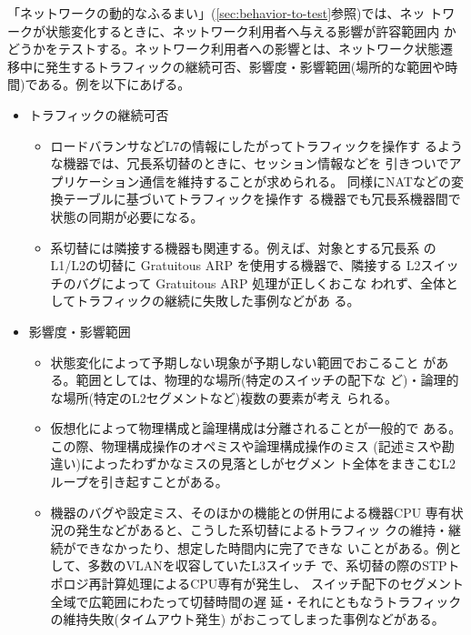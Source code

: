 「ネットワークの動的なふるまい」(\ref{sec:behavior-to-test}参照)では、ネッ
トワークが状態変化するときに、ネットワーク利用者へ与える影響が許容範囲内
かどうかをテストする。ネットワーク利用者への影響とは、ネットワーク状態遷
移中に発生するトラフィックの継続可否、影響度・影響範囲(場所的な範囲や時
間)である。例を以下にあげる。
\begin{itemize}
 \item トラフィックの継続可否
       \begin{itemize}
        \item ロードバランサなどL7の情報にしたがってトラフィックを操作す
              るような機器では、冗長系切替のときに、セッション情報などを
              引きついでアプリケーション通信を維持することが求められる。
              同様にNATなどの変換テーブルに基づいてトラフィックを操作す
              る機器でも冗長系機器間で状態の同期が必要になる。
        \item 系切替には隣接する機器も関連する。例えば、対象とする冗長系
              のL1/L2の切替に Gratuitous ARP を使用する機器で、隣接する
              L2スイッチのバグによって Gratuitous ARP 処理が正しくおこな
              われず、全体としてトラフィックの継続に失敗した事例などがあ
              る。
       \end{itemize}
 \item 影響度・影響範囲
       \begin{itemize}
        \item 状態変化によって予期しない現象が予期しない範囲でおこること
              がある。範囲としては、物理的な場所(特定のスイッチの配下な
              ど)・論理的な場所(特定のL2セグメントなど)複数の要素が考え
              られる。
        \item 仮想化によって物理構成と論理構成は分離されることが一般的で
              ある。この際、物理構成操作のオペミスや論理構成操作のミス
              (記述ミスや勘違い)によったわずかなミスの見落としがセグメン
              ト全体をまきこむL2ループを引き起すことがある。
        \item 機器のバグや設定ミス、そのほかの機能との併用による機器CPU
              専有状況の発生などがあると、こうした系切替によるトラフィッ
              クの維持・継続ができなかったり、想定した時間内に完了できな
              いことがある。例として、多数のVLANを収容していたL3スイッチ
              で、系切替の際のSTPトポロジ再計算処理によるCPU専有が発生し、
              スイッチ配下のセグメント全域で広範囲にわたって切替時間の遅
              延・それにともなうトラフィックの維持失敗(タイムアウト発生)
              がおこってしまった事例などがある。
       \end{itemize}
\end{itemize}

